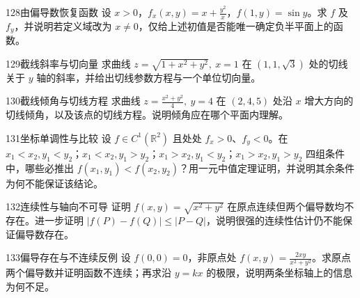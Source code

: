 \begin{exercise}{128}{由偏导数恢复函数}
设 $x>0$，$f_x(x,y)=x+\frac{y^2}x$，$f(1,y)=\sin y$。求 $f$ 及 $f_y$，并说明若定义域改为 $x\ne0$，仅给上述初值是否能唯一确定负半平面上的函数。
\end{exercise}
\begin{exercise}{129}{截线斜率与切向量}
求曲线 $z=\sqrt{1+x^2+y^2},\ x=1$ 在 $(1,1,\sqrt3)$ 处的切线关于 $y$ 轴的斜率，并给出切线参数方程与一个单位切向量。
\end{exercise}
\begin{exercise}{130}{截线倾角与切线方程}
求曲线 $z=\frac{x^2+y^2}4,\ y=4$ 在 $(2,4,5)$ 处沿 $x$ 增大方向的切线倾角，以及该点的切线方程。说明倾角应在哪个平面内理解。
\end{exercise}
\begin{exercise}{131}{坐标单调性与比较}
设 $f\in C^1(\mathbb R^2)$ 且处处 $f_x>0$、$f_y<0$。在 $x_1<x_2,y_1<y_2$；$x_1<x_2,y_1>y_2$；$x_1>x_2,y_1<y_2$；$x_1>x_2,y_1>y_2$ 四组条件中，哪些必推出 $f(x_1,y_1)<f(x_2,y_2)$？用一元中值定理证明，并说明其余条件为何不能保证该结论。
\end{exercise}
\begin{exercise}{132}{连续性与轴向不可导}
证明 $f(x,y)=\sqrt{x^2+y^2}$ 在原点连续但两个偏导数均不存在。进一步证明 $|f(P)-f(Q)|\le |P-Q|$，说明很强的连续性估计仍不能保证偏导数存在。
\end{exercise}
\begin{exercise}{133}{偏导存在与不连续反例}
设 $f(0,0)=0$，非原点处 $f(x,y)=\frac{2xy}{x^2+y^2}$。求原点两个偏导数并证明函数不连续；再求沿 $y=kx$ 的极限，说明两条坐标轴上的信息为何不足。
\end{exercise}

